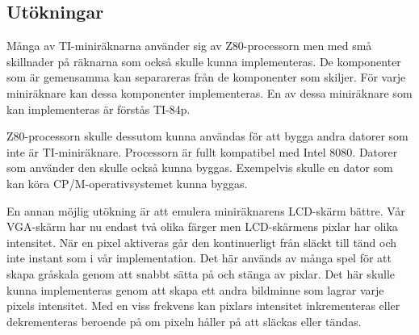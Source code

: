 \documentclass[main.tex]{subfiles}
\begin{document}
\subsection{Utökningar}
Många av TI-miniräknarna använder sig av Z80-processorn men med små skillnader
på räknarna som också skulle kunna implementeras. De komponenter som är
gemensamma kan separareras från de komponenter som skiljer. För varje
miniräknare kan dessa komponenter implementeras. En av dessa miniräknare som
kan implementeras är förstås TI-84p.

Z80-processorn skulle dessutom kunna användas för att bygga andra datorer som
inte är TI-miniräknare. Processorn är fullt kompatibel med Intel 8080. Datorer
som använder den skulle också kunna byggas. Exempelvis skulle en dator som kan
köra CP/M-operativsystemet kunna byggas.

En annan möjlig utökning är att emulera miniräknarens LCD-skärm bättre. Vår
VGA-skärm har nu endast två olika färger men LCD-skärmens pixlar har olika
intensitet. När en pixel aktiveras går den kontinuerligt från släckt till tänd
och inte instant som i vår implementation. Det här används av många spel för
att skapa gråskala genom att snabbt sätta på och stänga av pixlar. Det här
skulle kunna implementeras genom att skapa ett andra bildminne som lagrar varje
pixels intensitet. Med en viss frekvens kan pixlars intensitet inkrementeras
eller dekrementeras beroende på om pixeln håller på att släckas eller tändas.
\end{document}

